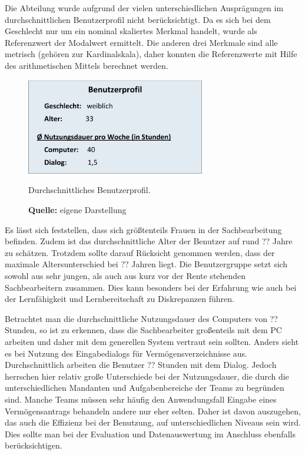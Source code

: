 Die Abteilung wurde aufgrund der vielen unterschiedlichen Ausprägungen im durchschnittlichen Benutzerprofil nicht berücksichtigt. Da es sich bei dem Geschlecht nur um ein nominal skaliertes Merkmal handelt, wurde als Referenzwert der Modalwert ermittelt. Die anderen drei Merkmale sind alle metrisch (gehören zur Kardinalskala), daher konnten die Referenzwerte mit Hilfe des arithmetischen Mittels berechnet werden.
\begin{figure}[H]
  \centering
  \includegraphics[width=295px]{img/durchschnittliches_Benutzerprofil.png}
  \caption{Durchschnittliches Benutzerprofil.}
  \caption*{\textbf{Quelle:} eigene Darstellung}
  \label{fig:durchschnittlichesBenutzerprofil}
\end{figure}
Es lässt sich feststellen, dass sich größtenteils Frauen in der Sachbearbeitung befinden. Zudem ist das durchschnittliche Alter der Benutzer auf rund ?? Jahre zu schätzen. Trotzdem sollte darauf Rücksicht genommen werden, dass der maximale Altersunterschied bei ?? Jahren liegt. Die Benutzergruppe setzt sich sowohl aus sehr jungen, als auch aus kurz vor der Rente stehenden Sachbearbeitern zusammen. Dies kann besonders bei der Erfahrung wie auch bei der Lernfähigkeit und Lernbereitschaft zu Diskrepanzen führen.

Betrachtet man die durchschnittliche Nutzungsdauer des Computers von ?? Stunden, so ist zu erkennen, dass die Sachbearbeiter großenteils mit dem PC arbeiten und daher mit dem generellen System vertraut sein sollten. Anders sieht es bei Nutzung des Eingabedialogs für Vermögensverzeichnisse aus. Durchschnittlich arbeiten die Benutzer ?? Stunden mit dem Dialog. Jedoch herrschen hier relativ große Unterschiede bei der Nutzungsdauer, die durch die unterschiedlichen Mandanten und Aufgabenbereiche der Teams zu begründen sind. Manche Teams müssen sehr häufig den Anwendungsfall \glqq Eingabe eines Vermögensantrags\grqq{} behandeln andere nur eher selten. Daher ist davon auszugehen, das auch die Effizienz bei der Benutzung, auf unterschiedlichen Niveaus sein wird. Dies sollte man bei der Evaluation und Datenauswertung im Anschluss ebenfalls berücksichtigen.

